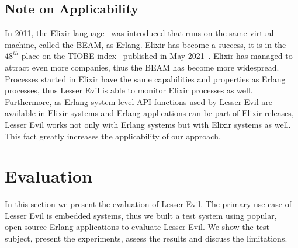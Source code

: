 \documentclass{llncs}
\begin{document}
\subsection{Note on Applicability}
In 2011, the Elixir language~\cite{elixir} was introduced that runs on the same virtual machine, called the BEAM, as Erlang. Elixir has become a success, it is in the $48^{th}$ place on the TIOBE index~\cite{tiobe} published in May 2021~\cite{tiobe2}. Elixir has managed to attract even more companies, thus the BEAM has become more widespread. Processes started in Elixir have the same capabilities and properties as  Erlang processes, thus Lesser Evil is able to monitor Elixir processes as well. Furthermore, as Erlang system level API functions used by Lesser Evil are available in Elixir systems and Erlang applications can be part of Elixir releases, Lesser Evil works not only with Erlang systems but with Elixir systems as well. This fact greatly increases the applicability of our approach.

\section{Evaluation}
In this section we present the evaluation of Lesser Evil.
The primary use case of Lesser Evil is embedded systems, thus we built a test system using popular, open-source Erlang applications  to evaluate Lesser Evil. We  show the test subject, present the experiments, assess the results and discuss the limitations.
\end{document}
